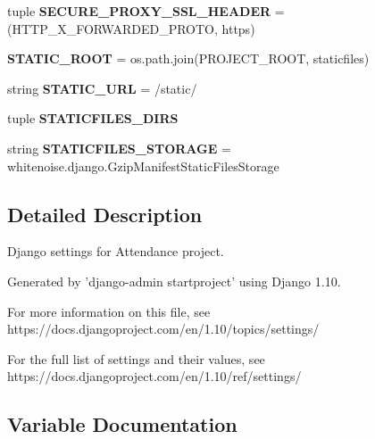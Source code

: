\begin{DoxyCompactItemize}
\item 
\hypertarget{namespaceclass__management_1_1settings_a9876faecdad5d0591280279d5c2d8393}{}\label{namespaceclass__management_1_1settings_a9876faecdad5d0591280279d5c2d8393} 
tuple {\bfseries S\+E\+C\+U\+R\+E\+\_\+\+P\+R\+O\+X\+Y\+\_\+\+S\+S\+L\+\_\+\+H\+E\+A\+D\+ER} = (\textquotesingle{}H\+T\+T\+P\+\_\+\+X\+\_\+\+F\+O\+R\+W\+A\+R\+D\+E\+D\+\_\+\+P\+R\+O\+TO\textquotesingle{}, \textquotesingle{}https\textquotesingle{})
\item 
\hypertarget{namespaceclass__management_1_1settings_a6ab2620fe753e59653e81c693bb58663}{}\label{namespaceclass__management_1_1settings_a6ab2620fe753e59653e81c693bb58663} 
{\bfseries S\+T\+A\+T\+I\+C\+\_\+\+R\+O\+OT} = os.\+path.\+join(P\+R\+O\+J\+E\+C\+T\+\_\+\+R\+O\+OT, \textquotesingle{}staticfiles\textquotesingle{})
\item 
\hypertarget{namespaceclass__management_1_1settings_a6d1eaddb6d3657589d893d6791861277}{}\label{namespaceclass__management_1_1settings_a6d1eaddb6d3657589d893d6791861277} 
string {\bfseries S\+T\+A\+T\+I\+C\+\_\+\+U\+RL} = \textquotesingle{}/static/\textquotesingle{}
\item 
tuple {\bfseries S\+T\+A\+T\+I\+C\+F\+I\+L\+E\+S\+\_\+\+D\+I\+RS}
\item 
\hypertarget{namespaceclass__management_1_1settings_a6fff660373eacf720c97417284a71bd5}{}\label{namespaceclass__management_1_1settings_a6fff660373eacf720c97417284a71bd5} 
string {\bfseries S\+T\+A\+T\+I\+C\+F\+I\+L\+E\+S\+\_\+\+S\+T\+O\+R\+A\+GE} = \textquotesingle{}whitenoise.\+django.\+Gzip\+Manifest\+Static\+Files\+Storage\textquotesingle{}
\end{DoxyCompactItemize}


\subsection{Detailed Description}
\begin{DoxyVerb}Django settings for Attendance project.

Generated by 'django-admin startproject' using Django 1.10.

For more information on this file, see
https://docs.djangoproject.com/en/1.10/topics/settings/

For the full list of settings and their values, see
https://docs.djangoproject.com/en/1.10/ref/settings/
\end{DoxyVerb}
 

\subsection{Variable Documentation}
\hypertarget{namespaceclass__management_1_1settings_ae50c7445fb231f0eca2f67ded248ea6e}{}\label{namespaceclass__management_1_1settings_ae50c7445fb231f0eca2f67ded248ea6e} 
